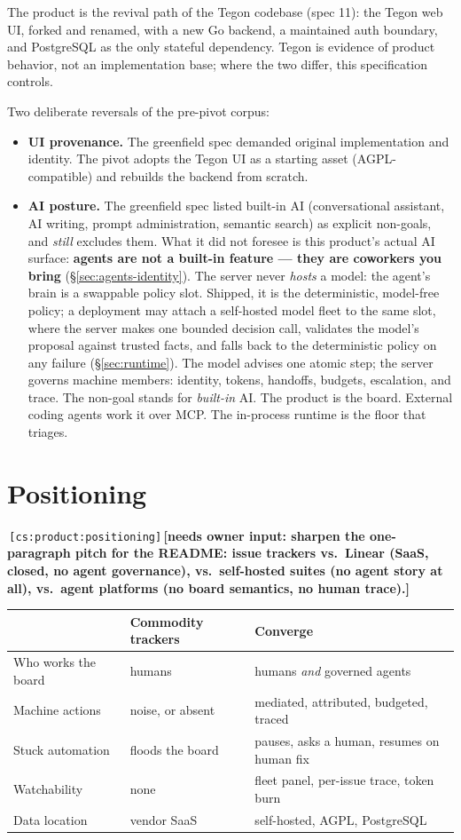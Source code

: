 \documentclass[11pt,a4paper]{report}
\newcommand{\cs}[1]{\,\texttt{\scriptsize[cs:#1]}\label{cs:#1}}
\newcommand{\owner}[1]{\,\textcolor{red!60!black}{\textbf{[needs owner input: #1]}}}
\begin{document}
The product is the revival path of the Tegon codebase (spec 11): the
Tegon web UI, forked and renamed, with a new Go backend, a maintained
auth boundary, and PostgreSQL as the only stateful dependency. Tegon is
evidence of product behavior, not an implementation base; where the two
differ, this specification controls.

Two deliberate reversals of the pre-pivot corpus:

\begin{itemize}
\item \textbf{UI provenance.} The greenfield spec demanded original
  implementation and identity. The pivot adopts the Tegon UI as a
  starting asset (AGPL-compatible) and rebuilds the backend from scratch.
\item \textbf{AI posture.} The greenfield spec listed built-in AI
  (conversational assistant, AI writing, prompt administration, semantic
  search) as explicit non-goals, and \emph{still} excludes them. What it
  did not foresee is this product's actual AI surface: \textbf{agents are
  not a built-in feature --- they are coworkers you bring}
  (\S\ref{sec:agents-identity}). The server never \emph{hosts} a model:
  the agent's brain is a swappable policy slot. Shipped, it is the
  deterministic, model-free policy; a deployment may attach a self-hosted
  model fleet to the same slot, where the server makes one bounded
  decision call, validates the model's proposal against trusted facts,
  and falls back to the deterministic policy on any failure
  (\S\ref{sec:runtime}). The model advises one atomic step; the server
  governs machine members: identity, tokens, handoffs, budgets,
  escalation, and trace. The non-goal stands for \emph{built-in} AI.
  The product is the board. External coding agents work it over MCP.
  The in-process runtime is the floor that triages.
\end{itemize}

\section{Positioning}
\cs{product:positioning}\owner{sharpen the one-paragraph pitch for
  the README: issue trackers vs.\ Linear (SaaS, closed, no agent
  governance), vs.\ self-hosted suites (no agent story at all), vs.\
  agent platforms (no board semantics, no human trace).}

\begin{center}
\begin{tabular}{@{}lll@{}}
\toprule
& \textbf{Commodity trackers} & \textbf{Converge}\\
\midrule
Who works the board & humans & humans \emph{and} governed agents\\
Machine actions & noise, or absent & mediated, attributed, budgeted, traced\\
Stuck automation & floods the board & pauses, asks a human, resumes on human fix\\
Watchability & none & fleet panel, per-issue trace, token burn\\
Data location & vendor SaaS & self-hosted, AGPL, PostgreSQL\\
\bottomrule
\end{tabular}
\end{center}
\end{document}
